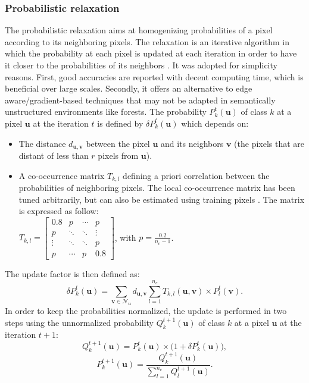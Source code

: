 \subsubsection{Probabilistic relaxation}
The probabilistic relaxation aims at homogenizing probabilities of a pixel according to its neighboring pixels. The relaxation is an iterative algorithm in which the probability at each pixel is updated at each iteration in order to have it closer to the probabilities of its neighbors \citep{Gong198933}. It was adopted for simplicity reasons. First, good accuracies are reported with decent computing time, which is beneficial over large scales. Secondly, it offers an alternative to edge aware/gradient-based techniques that may not be adapted in semantically unstructured environments like forests. The probability $P_{k}^{t}(\mathbf{u})$ of class $k$ at a pixel $\mathbf{u}$ at the iteration $t$ is defined by  $\delta P_{k}^{t}(\mathbf{u})$ which depends on:
\begin{itemize}
\item The distance $d_{\mathbf{u},\mathbf{v}}$ between the pixel $\mathbf{u}$ and its neighbors $\mathbf{v}$ (the pixels that are distant of less than $r$ pixels from $\mathbf{u}$).
\item A co-occurrence matrix $T_{k,l}$ defining a priori correlation between the probabilities of neighboring pixels. The local co-occurrence matrix has been tuned arbitrarily, but can also be estimated using training pixels \citep{VolpiCVPR2015}. The matrix is expressed as follow: \\
$T_{k,l}=\begin{bmatrix}
0.8 & p & \cdots & p \\
p & \ddots & \ddots & \vdots \\
\vdots & \ddots & \ddots & p \\
p & \cdots & p & 0.8
\end{bmatrix}$, with $p=\frac{0.2}{n_{c}-1}$.
\end{itemize}
The update factor is then defined as:
\begin{equation}
\delta P_{k}^{t}(\mathbf{u})=\sum_{\mathbf{v} \in \mathcal{N_{\mathbf{u}}}} d_{\mathbf{u},\mathbf{v}} \sum_{l=1}^{n_{c}} T_{k,l}(\mathbf{u},\mathbf{v}) \times P_{l}^{t}(\mathbf{v}).
\end{equation}
In order to keep the probabilities normalized, the update is performed in two steps using the unnormalized probability $Q_{k}^{t+1}(\mathbf{u})$ of class $k$ at a pixel $\mathbf{u}$ at the iteration $t+1$:
\begin{equation}
Q_{k}^{t+1}(\mathbf{u})=P_{k}^{t}(\mathbf{u}) \times \big(1 + \delta P_{k}^{t}(\mathbf{u})\big),
\end{equation}
\begin{equation}
P_{k}^{t+1}(\mathbf{u})=\frac{Q_{k}^{t+1}(\mathbf{u})}{\sum_{l=1}^{n_{c}}Q_{l}^{t+1}(\mathbf{u})}.
\end{equation}

